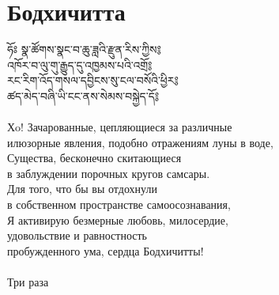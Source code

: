 \newpage

\section{Бодхичитта}

\ti
ཧོཿ སྣ་ཚོགས་སྣང་བ་ཆུ་ཟླའི་རྫུན་རིས་ཀྱིས༔\\
འཁོར་བ་ལུ་གུ་རྒྱུད་དུ་འཁྱམས་པའི་འགྲོ༔\\
རང་རིག་འོད་གསལ་དབྱིངས་སུ་ངལ་བསོའི་ཕྱིར༔\\
ཚད་མེད་བཞི་ཡི་ངང་ནས་སེམས་བསྐྱེད་དོ༔\\
\\
\ru
Хo! Зачарованные, цепляющиеся за различные \\
илюзорные явления, подобно отражениям луны в воде,\\
Существа, бесконечно скитающиеся\\
в заблуждении порочных кругов самсары.\\
Для того, что бы вы отдохнули\\
в собственном пространстве самоосознавания,\\
Я активирую безмерные любовь, милосердие,\\
удовольствие и равностность\\
пробужденного ума, сердца Бодхичитты!\\
\\
Три раза
